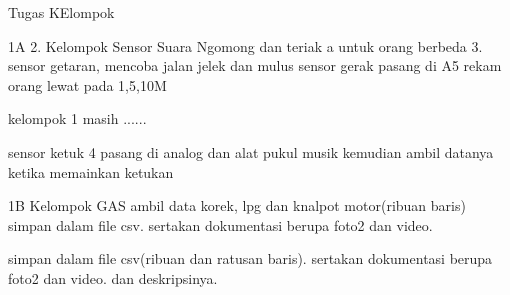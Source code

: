 Tugas KElompok

1A
2. Kelompok Sensor Suara
Ngomong dan teriak a untuk orang berbeda
3. sensor getaran, mencoba jalan jelek dan mulus
sensor gerak
pasang di A5 rekam orang lewat pada 1,5,10M

kelompok 1 masih ......

sensor ketuk 4
pasang di analog dan alat pukul musik kemudian ambil datanya ketika memainkan ketukan



1B
Kelompok GAS
ambil data korek, lpg dan knalpot motor(ribuan baris) simpan dalam file csv. sertakan dokumentasi berupa foto2 dan video.





simpan dalam file csv(ribuan dan ratusan baris). sertakan dokumentasi berupa foto2 dan video. dan deskripsinya.